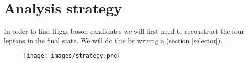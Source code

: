 \section{Analysis strategy}

In order to find Higgs boson candidates we will first need to reconstruct the four leptons in the final state. We will do this by writing a  (section \ref{selector}).


\begin{figure}[!h]
    \centering
    \texttt{[image: images/strategy.png]}
\end{figure}